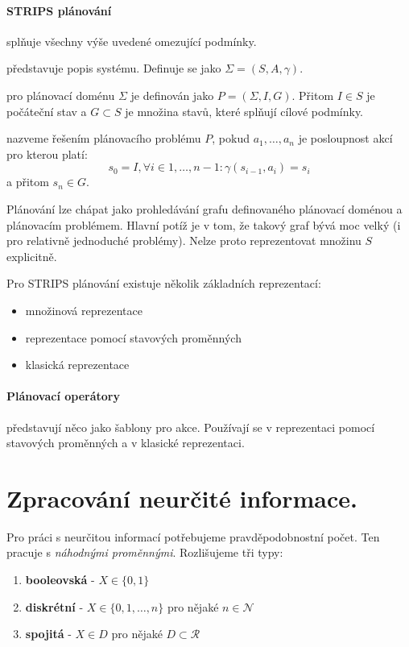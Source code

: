 \documentclass[a4paper]{article}      %
\newenvironment{definition}[1][Definice]{\begin{trivlist}
\item[\hskip \labelsep {\bfseries #1}]}{\end{trivlist}}
\begin{document}
\paragraph{STRIPS plánování} splňuje všechny výše uvedené omezující podmínky.

\begin{definition}[Plánovací doména]
představuje popis systému. Definuje se jako $\Sigma = (S,A,\gamma)$.
\end{definition}

\begin{definition}[Plánovací problém]
pro plánovací doménu $\Sigma$ je definován jako $P = (\Sigma,I,G)$. Přitom $I \in S$ je počáteční stav a $G \subset S$ je množina stavů, které splňují cílové podmínky. 
\end{definition}

\begin{definition}[Plán] nazveme řešením plánovacího problému $P$, pokud
$a_1,\ldots,a_n$ je posloupnost akcí pro kterou platí:
\[
s_0 = I, \forall i \in 1,\ldots,n-1: \gamma(s_{i-1},a_i) = s_{i}
\]
a přitom $s_n \in G$.
\end{definition}

Plánování lze chápat jako prohledávání grafu definovaného plánovací doménou a plánovacím problémem. Hlavní potíž je v tom, že takový graf bývá moc velký (i pro relativně jednoduché problémy). Nelze proto reprezentovat množinu $S$ explicitně.

Pro STRIPS plánování existuje několik základních reprezentací:
\begin{itemize}
\item množinová reprezentace
\item reprezentace pomocí stavových proměnných
\item klasická reprezentace
\end{itemize}

\paragraph{Plánovací operátory} představují něco jako šablony pro akce.
Používají se v reprezentaci pomocí stavových proměnných a v klasické reprezentaci.

\section{Zpracování neurčité informace.}
Pro práci s neurčitou informací potřebujeme pravděpodobnostní počet. Ten pracuje s \emph{náhodnými proměnnými}.
Rozlišujeme tři typy:
\begin{enumerate}
\item \textbf{booleovská} - $X \in \lbrace 0,1 \rbrace$
\item \textbf{diskrétní} - $X \in \lbrace 0,1,\ldots,n\rbrace$ pro nějaké $n \in \mathcal{N}$
\item \textbf{spojitá} - $X \in D$ pro nějaké $D \subset \mathcal{R}$
\end{enumerate}
\end{document}
